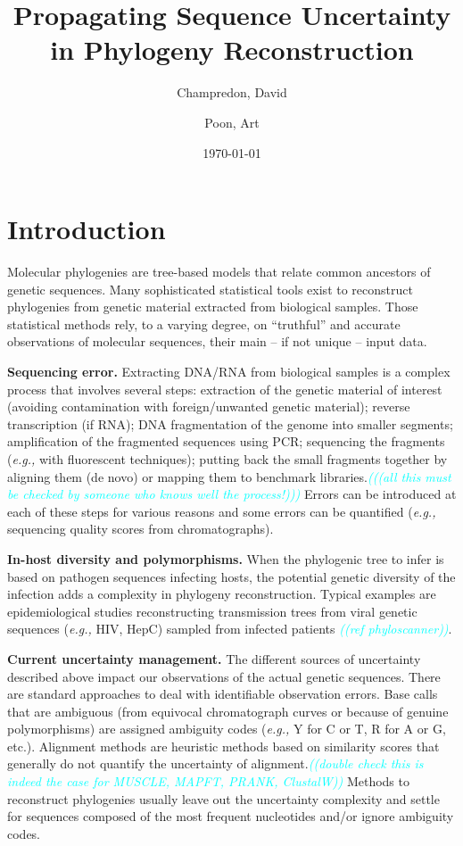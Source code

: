 \documentclass[10pt]{article}
\title{Propagating Sequence Uncertainty in Phylogeny Reconstruction}
\author{Champredon, David \and Poon, Art}
\date{\today}
\newcommand{\comment}[1]{\textsl{\textcolor{cyan}{((#1))}}}
\newcommand{\eg}{\textit{e.g.,}\xspace}
\begin{document}
\maketitle
\linenumbers

\section{Introduction}

Molecular phylogenies are tree-based models that relate common ancestors of genetic sequences.
Many sophisticated statistical tools exist to reconstruct phylogenies from genetic material extracted from biological samples. 
Those statistical methods rely, to a varying degree, on ``truthful'' and accurate observations of molecular sequences, their main -- if not unique -- input data.

\textbf{Sequencing error.} 
Extracting DNA/RNA from biological samples is a complex process that involves several steps: extraction of the genetic material of interest (avoiding contamination with foreign/unwanted genetic material); reverse transcription (if RNA); DNA fragmentation of the genome into smaller segments; amplification of the fragmented sequences using PCR; sequencing the fragments (\eg with fluorescent techniques); putting back the small fragments together by aligning them (de novo) or mapping them to benchmark libraries.\comment{(all this must be checked by someone who knows well the process!)}
Errors can be introduced at each of these steps for various reasons \cite{Beerenwinkel:2011} and some errors can be quantified (\eg sequencing quality scores from chromatographs). 

\textbf{In-host diversity and polymorphisms.} 
When the phylogenic tree to infer is based on pathogen sequences infecting hosts, the potential genetic diversity of the infection adds a complexity in phylogeny reconstruction. Typical examples are epidemiological studies reconstructing transmission trees from viral genetic sequences (\eg HIV, HepC) sampled from infected patients \comment{ref phyloscanner}. 


\textbf{Current uncertainty management.} 
The different sources of uncertainty described above impact our observations of the actual genetic sequences.
There are standard approaches to deal with identifiable observation errors. 
Base calls that are ambiguous (from equivocal chromatograph curves or because of genuine polymorphisms) are assigned ambiguity codes (\eg Y for C or T, R for A or G, etc.).
Alignment methods are heuristic methods based on similarity scores that generally do not quantify the uncertainty of alignment.\comment{double check this is indeed the case for MUSCLE, MAPFT, PRANK, ClustalW}
Methods to reconstruct phylogenies usually leave out the uncertainty complexity and settle for sequences composed of the most frequent nucleotides and/or ignore ambiguity codes.
\end{document}
